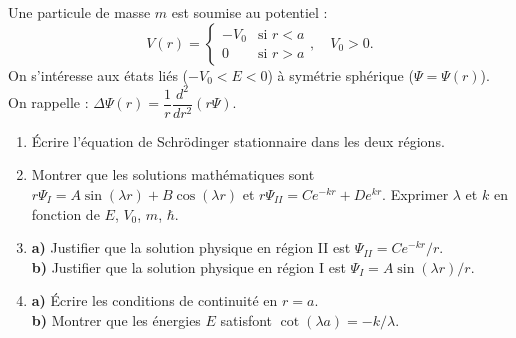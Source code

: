 \documentclass[12pt,a4paper]{article}
\begin{document}
\begin{boiteexercice}
Une particule de masse $m$ est soumise au potentiel :
\[
  V(r) = \begin{cases} -V_0 & \text{si } r < a \\ 0 & \text{si } r > a \end{cases},
  \quad V_0 > 0.
\]
On s'intéresse aux états liés ($-V_0 < E < 0$) à symétrie sphérique ($\Psi = \Psi(r)$).
On rappelle : $\Delta\Psi(r) = \dfrac{1}{r}\dfrac{d^2}{dr^2}(r\Psi)$.

\begin{enumerate}
  \item Écrire l'équation de Schrödinger stationnaire dans les deux régions.
  \item Montrer que les solutions mathématiques sont $r\Psi_I = A\sin(\lambda r)+B\cos(\lambda r)$
    et $r\Psi_{II} = Ce^{-kr}+De^{kr}$. Exprimer $\lambda$ et $k$ en fonction de $E$, $V_0$, $m$,
    $\hbar$.
  \item \textbf{a)} Justifier que la solution physique en région II est $\Psi_{II} = Ce^{-kr}/r$.\\
        \textbf{b)} Justifier que la solution physique en région I est $\Psi_I = A\sin(\lambda r)/r$.
  \item \textbf{a)} Écrire les conditions de continuité en $r=a$.\\
        \textbf{b)} Montrer que les énergies $E$ satisfont $\cot(\lambda a) = -k/\lambda$.
\end{enumerate}
\end{boiteexercice}
\end{document}
